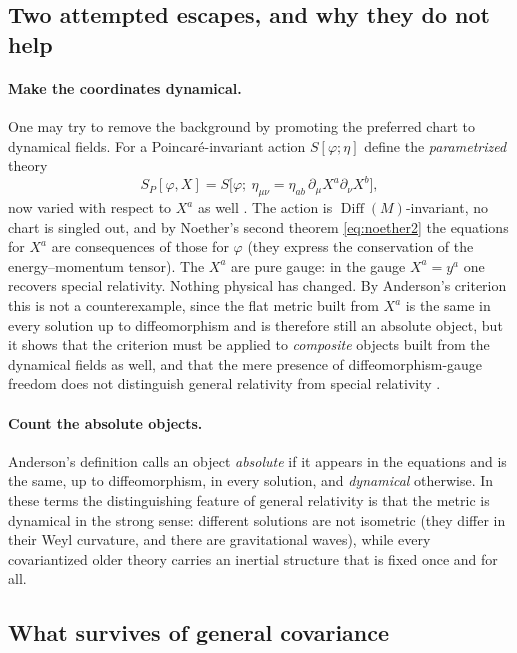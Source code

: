 \documentclass[11pt,a4paper,openany]{book}
\theoremstyle{definition}
\theoremstyle{plain}
\theoremstyle{remark}
\DeclareMathOperator{\Diff}{Diff}
\begin{document}
\subsection{Two attempted escapes, and why they do not help}

\paragraph{Make the coordinates dynamical.}
One may try to remove the background by promoting the preferred chart to
dynamical fields. For a Poincar\'e-invariant action $S[\varphi;\eta]$ define the
\emph{parametrized} theory
\begin{equation}
  S_P[\varphi,X]=S\big[\varphi;\ \eta_{\mu\nu}=\eta_{ab}\,\partial_\mu X^a\partial_\nu X^b\big],
\end{equation}
now varied with respect to $X^a$ as well \cite{kuchar}. The action is
$\Diff(M)$-invariant, no chart is singled out, and by Noether's second theorem
\eqref{eq:noether2} the equations for $X^a$ are consequences of those for
$\varphi$ (they express the conservation of the energy--momentum tensor). The
$X^a$ are pure gauge: in the gauge $X^a=y^a$ one recovers special relativity.
Nothing physical has changed. By Anderson's criterion this is not a
counterexample, since the flat metric built from $X^a$ is the same in every
solution up to diffeomorphism and is therefore still an absolute object, but
it shows that the criterion must be applied to \emph{composite} objects built
from the dynamical fields as well, and that the mere presence of
diffeomorphism-gauge freedom does not distinguish general relativity from
special relativity \cite{giulini}.

\paragraph{Count the absolute objects.}
Anderson's definition calls an object \emph{absolute} if it appears in the
equations and is the same, up to diffeomorphism, in every solution, and
\emph{dynamical} otherwise. In these terms the distinguishing feature of general
relativity is that the metric is dynamical in the strong sense: different
solutions are not isometric (they differ in their Weyl curvature, and there
are gravitational waves), while every covariantized older theory carries an
inertial structure that is fixed once and for all.

\subsection{What survives of general covariance}
\end{document}
